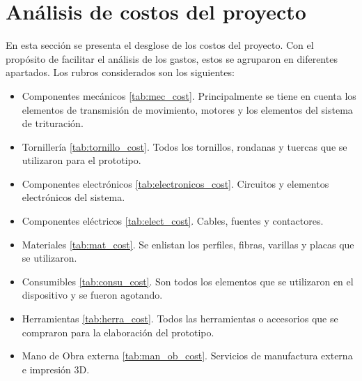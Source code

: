 \section{Análisis de costos del proyecto}

En esta sección se presenta el desglose de los costos del proyecto. Con el propósito de facilitar el análisis de los gastos, estos se agruparon en diferentes apartados. Los rubros considerados son los siguientes:
\begin{itemize}
    \item Componentes mecánicos \ref{tab:mec_cost}. Principalmente se tiene en cuenta los elementos de transmisión de movimiento, motores y los elementos del sistema de trituración.
    \item Tornillería \ref{tab:tornillo_cost}. Todos los tornillos, rondanas y tuercas que se utilizaron para el prototipo.
    \item Componentes electrónicos \ref{tab:electronicos_cost}. Circuitos y elementos electrónicos del sistema.
    \item Componentes eléctricos \ref{tab:elect_cost}. Cables, fuentes y contactores.
    \item Materiales \ref{tab:mat_cost}. Se enlistan los perfiles, fibras, varillas y placas que se utilizaron.
    \item Consumibles \ref{tab:consu_cost}. Son todos los elementos que se utilizaron en el dispositivo y se fueron agotando.
    \item Herramientas \ref{tab:herra_cost}. Todos las herramientas o accesorios que se compraron para la elaboración del prototipo.
    \item Mano de Obra externa \ref{tab:man_ob_cost}. Servicios de manufactura externa e impresión 3D.
\end{itemize}


